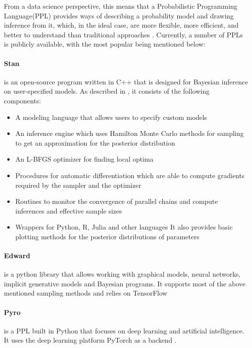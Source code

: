 \documentclass{article}
\begin{document}
From a data science perspective, this means that a Probabilistic Programming Language(PPL) provides ways of describing a probability model and drawing inference from it, which, in the ideal case, are more flexible, more efficient, and better to understand than traditional approaches \cite{Hardesty2015}. Currently, a number of PPLs is publicly available, with the most popular being mentioned below:
\paragraph{Stan}
is an open-source program written in C++ that is designed for Bayesian inference on user-specified models. As described in \cite{Gelman_2015}, it consists of the following components:
\begin{itemize}
	\item A modeling language that allows users to specify custom models
	\item An inference engine which uses Hamilton Monte Carlo methods for sampling to get an approximation for the posterior distribution
	\item An L-BFGS optimizer for finding local optima
	\item Procedures for automatic differentiation which are able to compute gradients required by the sampler and the optimizer
	\item Routines to monitor the convergence of parallel chains and compute inferences and effective sample sizes
	\item Wrappers for Python, R, Julia and other languages
It also provides basic plotting methods for the posterior distributions of parameters
\end{itemize}
\paragraph{Edward}
is a python library that allows working with graphical models, neural networks, implicit generative models and Bayesian programs. It supports most of the above mentioned sampling methods and relies on TensorFlow \cite{tran2016edward}
\paragraph{Pyro}
is a PPL built in Python that focuses on deep learning and artificial intelligence. It uses the deep learning platform PyTorch as a backend \cite{bingham2018pyro}.
\end{document}
